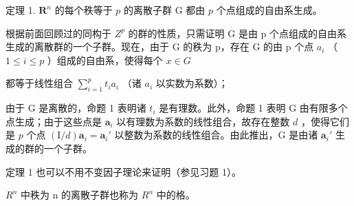 定理 1. \(\mathbf{R}^n\) 的每个秩等于 \(p\) 的离散子群 G 都由 \(p\) 个点组成的自由系生成。

根据前面回顾过的同构于 \(Z^{p}\) 的群的性质，只需证明 G 是由 p 个点组成的自由系生成的离散群的一个子群。现在，由于 G 的秩为 p，存在 G 的由 p 个点 \(a_{i}\) （ \(1 \leqslant i \leqslant p\) ）组成的自由系，使得每个 \(x \in G\)

都等于线性组合 \(\sum_{i=1}^{p} t_i a_i\) （诸 \(a_i\) 以实数为系数）；

由于 G 是离散的，命题 1 表明诸 \(t_i\) 是有理数。此外，命题 1 表明 G 由有限多个点生成；由于这些点是 \(\boldsymbol{a}_i\) 以有理数为系数的线性组合，故存在整数 \(d\) ，使得它们是 \(p\) 个点 \((\mathrm{I}/d)\boldsymbol{a}_i = \boldsymbol{a}_i'\) 以整数为系数的线性组合。由此推出，G 是由诸 \(\boldsymbol{a}_i'\) 生成的群的一个子群。

定理 1 也可以不用不变因子理论来证明（参见习题 1）。

\(R^{n}\) 中秩为 n 的离散子群也称为 \(R^{n}\) 中的格。

